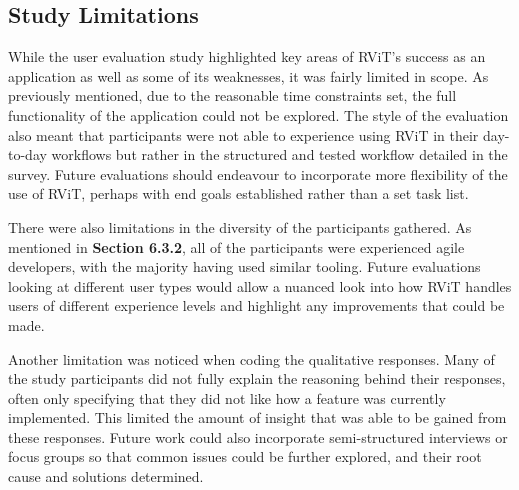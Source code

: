 \documentclass[l4proj.tex]{subfiles}
\begin{document}
\subsection{Study Limitations}
While the user evaluation study highlighted key areas of RViT's success as an application as well as some of its weaknesses, it was fairly limited in scope. As previously mentioned, due to the reasonable time constraints set, the full functionality of the application could not be explored. The style of the evaluation also meant that participants were not able to experience using RViT in their day-to-day workflows but rather in the structured and tested workflow detailed in the survey. Future evaluations should endeavour to incorporate more flexibility of the use of RViT, perhaps with end goals established rather than a set task list.

There were also limitations in the diversity of the participants gathered. As mentioned in \textbf{Section 6.3.2}, all of the participants were experienced agile developers, with the majority having used similar tooling. Future evaluations looking at different user types would allow a nuanced look into how RViT handles users of different experience levels and highlight any improvements that could be made.

Another limitation was noticed when coding the qualitative responses. Many of the study participants did not fully explain the reasoning behind their responses, often only specifying that they did not like how a feature was currently implemented. This limited the amount of insight that was able to be gained from these responses. Future work could also incorporate semi-structured interviews or focus groups so that common issues could be further explored, and their root cause and solutions determined. 
\end{document}
